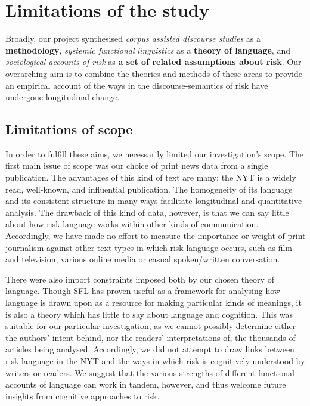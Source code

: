 
\chapter{Limitations of the study}


Broadly, our project synthesised \emph{corpus assisted discourse studies} as a \textbf{methodology}, \emph{systemic functional linguistics} as a \textbf{theory of language}, and \emph{sociological accounts of risk} as \textbf{a set of related assumptions about risk}. Our overarching aim is to combine the theories and methods of these areas to provide an empirical account of the ways in the discourse-semantics of risk have undergone longitudinal change.

\section{Limitations of scope}

In order to fulfill these aims, we necessarily limited our investigation's scope. The first main issue of scope was our choice of print news data from a single publication. The advantages of this kind of text are many: the NYT is a widely read, well-known, and influential publication. The homogeneity of its language and its consistent structure in many ways facilitate longitudinal and quantitative analysis. The drawback of this kind of data, however, is that we can say little about how risk language works within other kinds of communication. Accordingly, we have made no effort to measure the importance or weight of print journalism against other text types in which risk language occurs, such as film and television, various online media or casual spoken\slash written conversation.

There were also import constraints imposed both by our chosen theory of language. Though SFL has proven useful as a framework for analysing how language is drawn upon as a resource for making particular kinds of meanings, it is also a theory which has little to say about language and cognition. This was suitable for our particular investigation, as we cannot possibly determine either the authors' intent behind, nor the readers' interpretations of, the thousands of articles being analysed. Accordingly, we did not attempt to draw links between risk language in the NYT and the ways in which risk is cognitively understood by writers or readers. We suggest that the various strengths of different functional accounts of language can work in tandem, however, and thus welcome future insights from cognitive approaches to risk.

